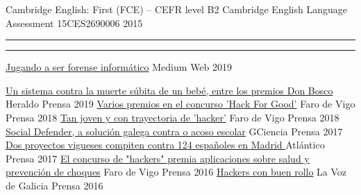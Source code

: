 \documentclass[11pt, a4paper]{style}
\begin{document}
\begin{cvhonors}
  \cvhonor
    {Cambridge English: First (FCE) – CEFR level B2} %
    {Cambridge English Language Assessment} %
    {15CES2690006} %
    {2015} %
\end{cvhonors}
\noindent\rule{\textwidth}{0pt}
\noindent\rule{\textwidth}{0pt}
\begin{cvhonors}
  \cvhonor
    {\href{https://medium.com/@kikefontanlorenzo/jugando-a-ser-forense-informático-c3cb5f4ff1e3}{Jugando a ser forense informático}} %
    {Medium} %
    {Web} %
    {2019} %
\end{cvhonors}
\begin{cvhonors}
  \cvhonor
    {\href{https://www.heraldo.es/noticias/aragon/2019/03/15/un-sistema-contra-la-muerte-subita-de-un-bebe-entre-los-premios-don-bosco-1303128.html}{Un sistema contra la muerte súbita de un bebé, entre los premios Don Bosco}} %
    {Heraldo} %
    {Prensa} %
    {2019} %
  \cvhonor
    {\href{https://www.farodevigo.es/galicia/2018/05/02/premios-concurso-hack-for-good/1883325.html}{Varios premios en el concurso 'Hack For Good'}} %
    {Faro de Vigo} %
    {Prensa} %
    {2018} %
  \cvhonor
    {\href{https://www.farodevigo.es/galicia/2018/05/02/joven-trayectoria-hacker/1883326.html}{Tan joven y con trayectoria de 'hacker'}} %
    {Faro de Vigo} %
    {Prensa} %
    {2018} %
  \cvhonor
    {\href{https://www.gciencia.com/tecno/social-defender-solucion-galega-acoso-escolar/}{Social Defender, a solución galega contra o acoso escolar}} %
    {GCiencia} %
    {Prensa} %
    {2017} %
  \cvhonor
    {\href{https://www.atlantico.net/articulo/economia/proyectos-vigueses-compiten-124-espanoles-madrid/20170412120325583713.html}{Dos proyectos vigueses compiten contra 124 españoles en Madrid }} %
    {Atlántico} %
    {Prensa} %
    {2017} %
  \cvhonor
    {\href{https://www.farodevigo.es/gran-vigo/2016/03/01/concurso-hackers-premia-aplicaciones-salud/1414301.html}{El concurso de "hackers" premia aplicaciones sobre salud y prevención de choques}} %
    {Faro de Vigo} %
    {Prensa} %
    {2016} %
  \cvhonor
    {\href{https://www.lavozdegalicia.es/noticia/vigo/vigo/2016/02/26/hackers-buen-rollo-vigo/0003_201602V26C12991.htm}{Hackers con buen rollo}} %
    {La Voz de Galicia} %
    {Prensa} %
    {2016} %
\end{cvhonors}
\end{document}

